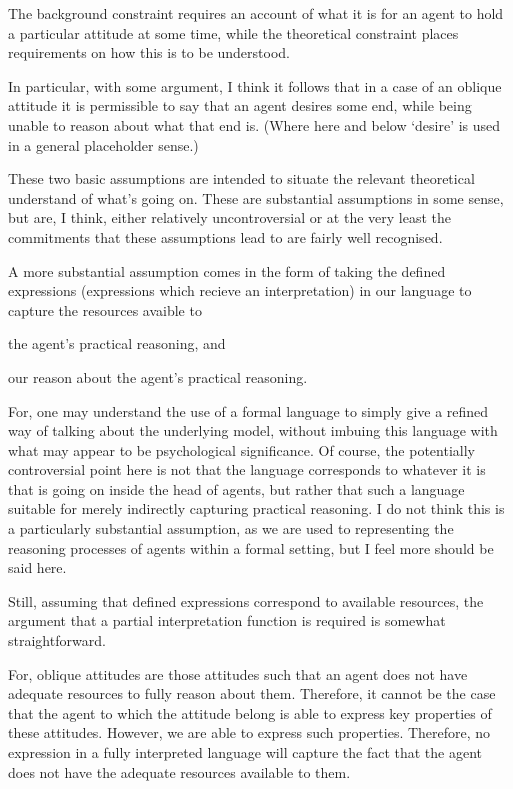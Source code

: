 \documentclass[10pt]{article}
\begin{document}
The background constraint requires an account of what it is for an agent to hold a particular attitude at some time, while the theoretical constraint places requirements on how this is to be understood.

In particular, with some argument, I think it follows that in a case of an oblique attitude it is permissible to say that an agent desires some end, while being unable to reason about what that end is.
(Where here and below `desire' is used in a general placeholder sense.)

These two basic assumptions are intended to situate the relevant theoretical understand of what's going on.
These are substantial assumptions in some sense, but are, I think, either relatively uncontroversial or at the very least the commitments that these assumptions lead to are fairly well recognised.

A more substantial assumption comes in the form of taking the defined expressions (expressions which recieve an interpretation) in our language to capture the resources avaible to
\begin{enumerate*}[label=(\alph*)]
\item the agent's practical reasoning, and
\item our reason about the agent's practical reasoning.
\end{enumerate*}
For, one may understand the use of a formal language to simply give a refined way of talking about the underlying model, without imbuing this language with what may appear to be psychological significance.
Of course, the potentially controversial point here is not that the language corresponds to whatever it is that is going on inside the head of agents, but rather that such a language suitable for merely indirectly capturing practical reasoning.
I do not think this is a particularly substantial assumption, as we are used to representing the reasoning processes of agents within a formal setting, but I feel more should be said here.

Still, assuming that defined expressions correspond to available resources, the argument that a partial interpretation function is required is somewhat straightforward.

For, oblique attitudes are those attitudes such that an agent does not have adequate resources to fully reason about them.
Therefore, it cannot be the case that the agent to which the attitude belong is able to express key properties of these attitudes.
However, we are able to express such properties.
Therefore, no expression in a fully interpreted language will capture the fact that the agent does not have the adequate resources available to them.
\end{document}
